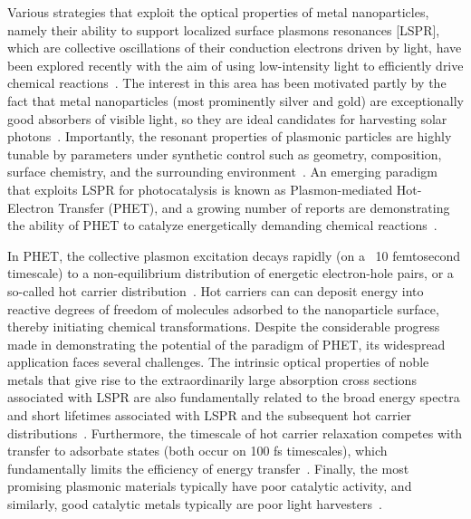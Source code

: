 \documentclass[journal=jpclcd,manuscript=article]{achemso}
\begin{document}
Various strategies that exploit the optical properties of metal nanoparticles, namely their ability to support localized surface plasmons resonances [LSPR], 
which are collective oscillations of their 
conduction electrons driven by light, have been explored recently with the aim of using low-intensity light to efficiently drive chemical 
reactions~\cite{LCI_NatureMater_2011,KAC_ACSCatalysis_2013,ZLQ_RSCAdvances_2015,PKL_AccChemRes_2015}.  The interest in this area has 
been motivated partly by the fact that metal nanoparticles (most prominently silver and gold) are exceptionally good absorbers of visible light, 
so they are ideal candidates for harvesting solar photons~\cite{AP_NatMat_2010}.  
Importantly, the resonant properties of plasmonic particles are highly tunable by parameters under synthetic control such as geometry, composition, surface chemistry, and the surrounding 
environment~\cite{SX_Science_2002,BCN_ChemRev_2005,GB_NatPhoton_2010}.  An emerging paradigm that exploits LSPR for photocatalysis is known as Plasmon-mediated Hot-Electron Transfer (PHET),
and a growing number of reports are demonstrating the ability of PHET to catalyze energetically demanding chemical 
reactions~\cite{CXL_NatureChem_2011,MZL_Science_2013,MLL_NanoLett_2013,LFP_AC_2015,ZHX_NatPhoton_2016,ZJM_ACSNano_2016,SZZ_PNAS_2016,SCR_JPCC_2016}.

In PHET, the collective plasmon excitation decays rapidly (on a ~10 femtosecond timescale) to a non-equilibrium distribution of energetic electron-hole pairs, or a so-called hot carrier 
distribution~\cite{KAC_ACSCatalysis_2013,GZG_JPCC_2013,SNJ_NatComm_2014,WCM_Science_2015,MWW_NatComm_2015, BSN_ACSNano_2016}.  
Hot carriers can can deposit energy into reactive degrees of freedom of molecules adsorbed to the nanoparticle surface, thereby initiating chemical transformations.  Despite the considerable progress made in 
demonstrating the potential of the paradigm of PHET, its widespread application faces several challenges. The intrinsic optical properties of noble metals that give rise to the extraordinarily 
large absorption cross sections associated with LSPR are also fundamentally related to the broad energy spectra and short lifetimes associated with LSPR and the subsequent hot carrier 
distributions~\cite{KS_JCP_1983}. 
Furthermore, the timescale of hot carrier relaxation competes 
with transfer to adsorbate states (both occur on 100 fs timescales), which fundamentally limits the efficiency of energy transfer~\cite{WCM_Science_2015}.  Finally, the most promising plasmonic materials typically have poor catalytic activity, and similarly,
good catalytic metals typically are poor light harvesters~\cite{SZZ_PNAS_2016}.
\end{document}
